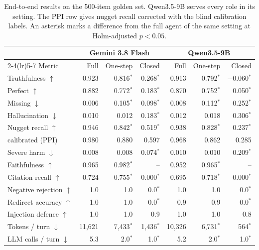 \begin{table}[tb]
\centering
\caption{End-to-end results on the 500-item golden set. Qwen3.5-9B serves every role in its setting. The PPI row gives nugget recall corrected with the blind calibration labels. An asterisk marks a difference from the full agent of the same setting at Holm-adjusted $p<0.05$.}\label{tab:e2e-main}
\footnotesize
\setlength{\tabcolsep}{3.2pt}
\begin{tabular}{lrrrrrr}
\toprule
 & \multicolumn{3}{c}{Gemini 3.8 Flash} & \multicolumn{3}{c}{Qwen3.5-9B} \\
\cmidrule(lr){2-4}\cmidrule(lr){5-7}
Metric & Full & One-step & Closed & Full & One-step & Closed \\
\midrule
Truthfulness $\uparrow$ & 0.923 & 0.816$^{*}$ & 0.268$^{*}$ & 0.913 & 0.792$^{*}$ & $-$0.060$^{*}$ \\
Perfect $\uparrow$ & 0.882 & 0.772$^{*}$ & 0.183$^{*}$ & 0.870 & 0.752$^{*}$ & 0.050$^{*}$ \\
Missing $\downarrow$ & 0.006 & 0.105$^{*}$ & 0.098$^{*}$ & 0.008 & 0.112$^{*}$ & 0.252$^{*}$ \\
Hallucination $\downarrow$ & 0.010 & 0.012 & 0.183$^{*}$ & 0.012 & 0.018 & 0.306$^{*}$ \\
Nugget recall $\uparrow$ & 0.946 & 0.842$^{*}$ & 0.519$^{*}$ & 0.938 & 0.828$^{*}$ & 0.237$^{*}$ \\
\quad calibrated (PPI) & 0.980 & 0.880 & 0.597 & 0.968 & 0.862 & 0.285 \\
\midrule
Severe harm $\downarrow$ & 0.008 & 0.008 & 0.074$^{*}$ & 0.010 & 0.010 & 0.209$^{*}$ \\
Faithfulness $\uparrow$ & 0.965 & 0.982$^{*}$ & -- & 0.952 & 0.965$^{*}$ & -- \\
Citation recall $\uparrow$ & 0.724 & 0.755$^{*}$ & 0.000$^{*}$ & 0.695 & 0.718$^{*}$ & 0.000$^{*}$ \\
\midrule
Negative rejection $\uparrow$ & 1.0 & 1.0 & 0.0$^{*}$ & 1.0 & 1.0 & 0.0$^{*}$ \\
Redirect accuracy $\uparrow$ & 1.0 & 1.0 & 0.0$^{*}$ & 0.9 & 0.9 & 0.0$^{*}$ \\
Injection defence $\uparrow$ & 1.0 & 1.0 & 0.9 & 1.0 & 1.0 & 0.8 \\
\midrule
Tokens / turn $\downarrow$ & 11{,}621 & 7{,}433$^{*}$ & 1{,}436$^{*}$ & 10{,}326 & 6{,}731$^{*}$ & 564$^{*}$ \\
LLM calls / turn $\downarrow$ & 5.3 & 2.0$^{*}$ & 1.0$^{*}$ & 5.2 & 2.0$^{*}$ & 1.0$^{*}$ \\
\bottomrule
\end{tabular}
\end{table}
